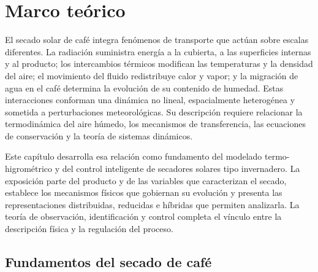 
\clearpage
\chapter{Marco teórico}
\label{ch:marco_teorico}

El secado solar de café integra fenómenos de transporte que actúan sobre escalas diferentes. La radiación suministra energía a la cubierta, a las superficies internas y al producto; los intercambios térmicos modifican las temperaturas y la densidad del aire; el movimiento del fluido redistribuye calor y vapor; y la migración de agua en el café determina la evolución de su contenido de humedad. Estas interacciones conforman una dinámica no lineal, espacialmente heterogénea y sometida a perturbaciones meteorológicas. Su descripción requiere relacionar la termodinámica del aire húmedo, los mecanismos de transferencia, las ecuaciones de conservación y la teoría de sistemas dinámicos.

Este capítulo desarrolla esa relación como fundamento del modelado termo-higrométrico y del control inteligente de secadores solares tipo invernadero. La exposición parte del producto y de las variables que caracterizan el secado, establece los mecanismos físicos que gobiernan su evolución y presenta las representaciones distribuidas, reducidas e híbridas que permiten analizarla. La teoría de observación, identificación y control completa el vínculo entre la descripción física y la regulación del proceso.

\section{Fundamentos del secado de café}
\label{sec:fundamentos_secado}


